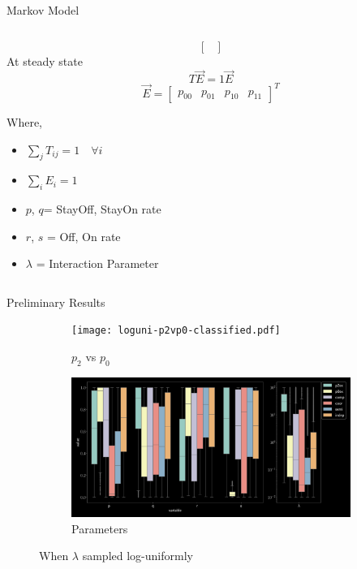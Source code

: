 \documentclass[aspectratio=169,9pt]{beamer}
\begin{document}
\begin{frame}{Markov Model}
\begin{columns}
\begin{column}{0.4\textwidth}
\[\begin{bmatrix}
        \end{bmatrix}
        \]
        At steady state
        $$ T\vec{E} = 1 \vec{E}$$
        $$ \vec{E} = \begin{bmatrix}p_{00} & p_{01} & p_{10} & p_{11} \end{bmatrix}^T$$
        \scriptsize{
        Where,
            \begin{itemize}  
                \item $\sum_j T_{ij} = 1 \quad \forall i$
                \item $\sum_i E_{i} = 1$
                \item $p$, $q$= StayOff, StayOn rate
                \item $r$, $s$  = Off, On rate
                \item $\lambda$ = Interaction Parameter
            \end{itemize}}
        \end{column}
    \end{columns}
\end{frame}

\begin{frame}{Preliminary Results}
    \begin{figure}[h]
        \begin{adjustwidth}{-5cm}{-5cm}
          \centering
          \begin{subfigure}[b]{0.33\textwidth}
            \centering
            \texttt{[image: loguni-p2vp0-classified.pdf]}
            \caption{$p_2$ vs $p_0$}
          \end{subfigure}
          \begin{subfigure}[b]{0.66\textwidth}
            \centering
            \includegraphics[width=\textwidth]{loguni-parms.pdf}
            \caption{Parameters}
          \end{subfigure}
        \end{adjustwidth}
        \caption{When $\lambda$ sampled log-uniformly}
      \end{figure}
\end{frame}
\end{document}
